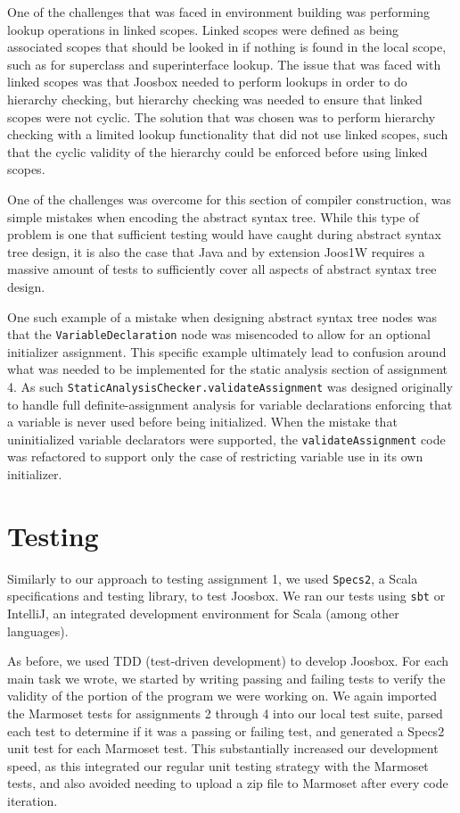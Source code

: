 \documentclass[letterpaper]{article}
\begin{document}
  One of the challenges that was faced in environment building was performing
  lookup operations in linked scopes. Linked scopes were defined as being
  associated scopes that should be looked in if nothing is found in the local
  scope, such as for superclass and superinterface lookup. The issue that was
  faced with linked scopes was that Joosbox needed to perform lookups in order
  to do hierarchy checking, but hierarchy checking was needed to ensure that
  linked scopes were not cyclic. The solution that was chosen was to perform
  hierarchy checking with a limited lookup functionality that did not use
  linked scopes, such that the cyclic validity of the hierarchy could be
  enforced before using linked scopes.

  One of the challenges was overcome for this section of compiler construction,
  was simple mistakes when encoding the abstract syntax tree. While this type of
  problem is one that sufficient testing would have caught during abstract
  syntax tree design, it is also the case that Java and by extension Joos1W
  requires a massive amount of tests to sufficiently cover all aspects of
  abstract syntax tree design.

  One such example of a mistake when designing abstract syntax tree nodes was
  that the {\tt VariableDeclaration} node was misencoded to allow for an optional
  initializer assignment. This specific example ultimately lead to confusion
  around what was needed to be implemented for the static analysis section of
  assignment 4. As such {\tt StaticAnalysisChecker.validateAssignment}
  was designed originally to handle full definite-assignment analysis for
  variable declarations enforcing that a variable is never used before being
  initialized. When the mistake that uninitialized variable declarators were
  supported, the {\tt validateAssignment} code was refactored to support only
  the case of restricting variable use in its own initializer.

  \section{Testing}

  Similarly to our approach to testing assignment 1, we used {\tt Specs2}, a
  Scala specifications and testing library, to test Joosbox. We ran our tests
  using {\tt sbt} or IntelliJ, an integrated development environment for Scala
  (among other languages).

  As before, we used TDD (test-driven development) to develop Joosbox. For
  each main task we wrote, we started by writing passing and failing tests to
  verify the validity of the portion of the program we were working on. We
  again imported the Marmoset tests for assignments 2 through 4 into our local
  test suite, parsed each test to determine if it was a passing or failing
  test, and generated a Specs2 unit test for each Marmoset test. This
  substantially increased our development speed, as this integrated our
  regular unit testing strategy with the Marmoset tests, and also avoided
  needing to upload a zip file to Marmoset after every code iteration.
\end{document}

